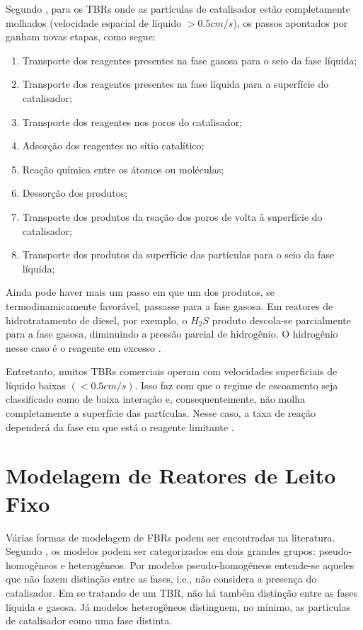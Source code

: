 Segundo , para os TBRs onde as partículas de
catalisador estão completamente molhados (velocidade espacial de líquido $>0.5
cm/s$), os passos apontados por  ganham novas etapas,
como segue:

\begin{enumerate}
\item Transporte dos reagentes presentes na fase gasosa para o seio da
fase líquida;
\item Transporte dos reagentes presentes na fase líquida para a superfície do
catalisador;
\item Transporte dos reagentes nos poros do catalisador;
\item Adsorção dos reagentes no sítio catalítico;
\item Reação química entre os átomos ou moléculas;
\item Dessorção dos produtos;
\item Transporte dos produtos da reação dos poros de volta à
superfície do catalisador;
\item Transporte dos produtos da superfície das partículas para o seio da fase
líquida;
\end{enumerate} 

Ainda pode haver mais um passo em que um dos produtos, se termodinamicamente
favorável, passasse para a fase gasosa. Em reatores de hidrotratamento de
diesel, por exemplo, o $H_2S$ produto descola-se parcialmente para a fase
gasosa, diminuindo a pressão parcial de hidrogênio. O hidrogênio nesse caso é
o reagente em excesso \cite{Ancheyta2011}.

Entretanto, muitos TBRs comerciais operam com velocidades superficiais de
líquido baixas $(<0.5 cm/s)$. Isso faz com que o regime de escoamento seja
classificado como de baixa interação e, consequentemente, não molha
completamente a superfície das partículas. Nesse caso, a taxa de reação
dependerá da fase em que está o reagente limitante \cite{Ranade2011}.

\section {Modelagem de Reatores de Leito Fixo} \label{sec:modelagemreatores}

Várias formas de modelagem de FBRs podem ser encontradas na literatura.
Segundo , os modelos podem ser categorizados em dois grandes
grupos: pseudo-homogêneos e heterogêneos. Por modelos pseudo-homogêneos entende-se aqueles que não fazem
distinção entre as fases, i.e., não considera a presença do catalisador. Em se
tratando de um TBR, não há também distinção entre as fases líquida e gasosa. Já
modelos heterogêneos distinguem, no mínimo, as partículas de catalisador como uma fase distinta.

